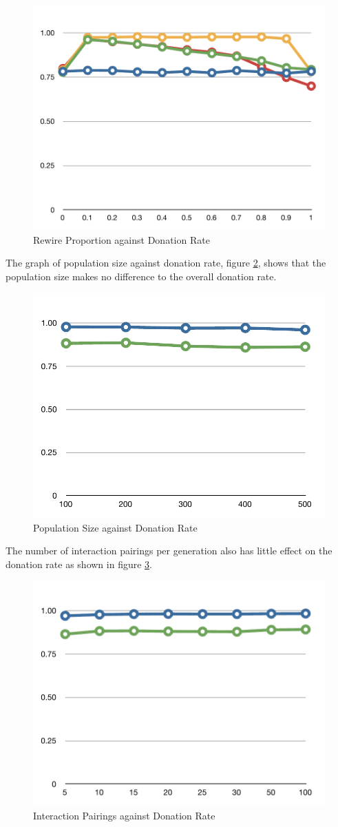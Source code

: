 \begin{figure}[h]
	\centering
	\includegraphics[width=0.4\linewidth]{img/testing_rewire_proportion.pdf}
	\caption{Rewire Proportion against Donation Rate}
	\label{fig:testing_rewire_proportion}
\end{figure}

The graph of population size against donation rate, figure \ref{fig:testing_population_size}, shows that the population size makes no difference to the overall donation rate.

\begin{figure}[h]
	\centering
	\includegraphics[width=0.4\linewidth]{img/testing_population_size.pdf}
	\caption{Population Size against Donation Rate}
	\label{fig:testing_population_size}
\end{figure}

The number of interaction pairings per generation also has little effect on the donation rate as shown in figure \ref{fig:testing_interaction_pairings}.

\begin{figure}[h]
	\centering
	\includegraphics[width=0.4\linewidth]{img/testing_interaction_pairings.pdf}
	\caption{Interaction Pairings against Donation Rate}
	\label{fig:testing_interaction_pairings}
\end{figure}


